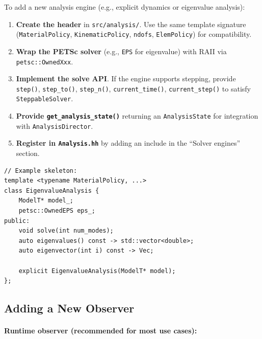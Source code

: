 To add a new analysis engine (e.g., explicit dynamics or eigenvalue analysis):

\begin{enumerate}
  \item \textbf{Create the header} in \texttt{src/analysis/}.  Use the same
        template signature (\texttt{MaterialPolicy}, \texttt{KinematicPolicy},
        \texttt{ndofs}, \texttt{ElemPolicy}) for compatibility.

  \item \textbf{Wrap the PETSc solver} (e.g., \texttt{EPS} for eigenvalue)
        with RAII via \texttt{petsc::OwnedXxx}.

  \item \textbf{Implement the solve API}.  If the engine supports stepping,
        provide \texttt{step()}, \texttt{step\_to()}, \texttt{step\_n()},
        \texttt{current\_time()}, \texttt{current\_step()} to satisfy
        \texttt{SteppableSolver}.

  \item \textbf{Provide \texttt{get\_analysis\_state()}} returning an
        \texttt{AnalysisState} for integration with \texttt{AnalysisDirector}.

  \item \textbf{Register in \texttt{Analysis.hh}} by adding an include in
        the ``Solver engines'' section.
\end{enumerate}

\begin{verbatim}
// Example skeleton:
template <typename MaterialPolicy, ...>
class EigenvalueAnalysis {
    ModelT* model_;
    petsc::OwnedEPS eps_;
public:
    void solve(int num_modes);
    auto eigenvalues() const -> std::vector<double>;
    auto eigenvector(int i) const -> Vec;

    explicit EigenvalueAnalysis(ModelT* model);
};
\end{verbatim}


\subsection{Adding a New Observer}
\label{sec:arch:ext:observer}

\paragraph{Runtime observer (recommended for most use cases):}

